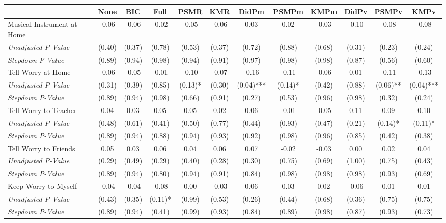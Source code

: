 \begin{tabular}{l c c c c c c c c c c c}
\toprule
 & None & BIC & Full & PSMR & KMR & DidPm & PSMPm & KMPm & DidPv & PSMPv & KMPv \\
\midrule
Musical Instrument at Home & -0.06 & -0.06 & -0.02 & -0.05 & -0.06 & 0.03 & 0.02 & -0.03 & -0.10 & -0.08 & -0.08 \\
\quad \textit{Unadjusted P-Value} & (0.40) & (0.37) & (0.78) & (0.53) & (0.37) & (0.72) & (0.88) & (0.68) & (0.31) & (0.23) & (0.24) \\
\quad \textit{Stepdown P-Value} & (0.89) & (0.94) & (0.98) & (0.94) & (0.91) & (0.97) & (0.98) & (0.98) & (0.87) & (0.56) & (0.60) \\
Tell Worry at Home & -0.06 & -0.05 & -0.01 & -0.10 & -0.07 & -0.16 & -0.11 & -0.06 & 0.01 & -0.11 & -0.13 \\
\quad \textit{Unadjusted P-Value} & (0.31) & (0.39) & (0.85) & (0.13)* & (0.30) & (0.04)*** & (0.14)* & (0.42) & (0.88) & (0.06)** & (0.04)*** \\
\quad \textit{Stepdown P-Value} & (0.89) & (0.94) & (0.98) & (0.66) & (0.91) & (0.27) & (0.53) & (0.96) & (0.98) & (0.32) & (0.24) \\
Tell Worry to Teacher & 0.04 & 0.03 & 0.05 & 0.05 & 0.02 & 0.06 & -0.01 & -0.05 & 0.11 & 0.09 & 0.10 \\
\quad \textit{Unadjusted P-Value} & (0.48) & (0.61) & (0.41) & (0.50) & (0.77) & (0.44) & (0.93) & (0.47) & (0.21) & (0.14)* & (0.11)* \\
\quad \textit{Stepdown P-Value} & (0.89) & (0.94) & (0.88) & (0.94) & (0.93) & (0.92) & (0.98) & (0.96) & (0.85) & (0.42) & (0.38) \\
Tell Worry to Friends & 0.05 & 0.03 & 0.06 & 0.04 & 0.06 & 0.07 & -0.02 & -0.03 & 0.00 & 0.02 & 0.04 \\
\quad \textit{Unadjusted P-Value} & (0.29) & (0.49) & (0.29) & (0.40) & (0.28) & (0.30) & (0.75) & (0.69) & (1.00) & (0.75) & (0.43) \\
\quad \textit{Stepdown P-Value} & (0.89) & (0.94) & (0.80) & (0.94) & (0.91) & (0.84) & (0.98) & (0.98) & (0.98) & (0.93) & (0.69) \\
Keep Worry to Myself & -0.04 & -0.04 & -0.08 & 0.00 & -0.03 & 0.06 & 0.03 & 0.02 & -0.06 & 0.01 & 0.01 \\
\quad \textit{Unadjusted P-Value} & (0.43) & (0.35) & (0.11)* & (0.99) & (0.53) & (0.26) & (0.44) & (0.68) & (0.36) & (0.75) & (0.75) \\
\quad \textit{Stepdown P-Value} & (0.89) & (0.94) & (0.41) & (0.99) & (0.93) & (0.84) & (0.89) & (0.98) & (0.87) & (0.93) & (0.73) \\

\end{tabular}
